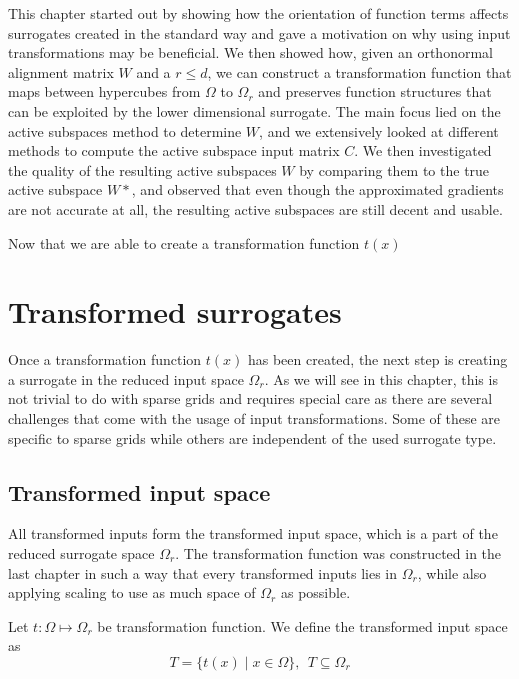 \documentclass[
  a4paper,  %
  twoside,  %
  bibliography=totoc,
  headsepline,
  cleardoublepage=empty,
  parskip=half,
  draft=false
]{scrbook}
\begin{document}
This chapter started out by showing how the orientation of function terms affects surrogates created in the standard way and gave a motivation on why using input transformations may be beneficial.
We then showed how, given an orthonormal alignment matrix $W$ and a $r \leq d$, we can construct a transformation function that maps between hypercubes from $\Omega$ to $\Omega_r$ and preserves function structures that can be exploited by the lower dimensional surrogate.
The main focus lied on the active subspaces method to determine $W$, and we extensively looked at different methods to compute the active subspace input matrix $C$.
We then investigated the quality of the resulting active subspaces $W$ by comparing them to the true active subspace $W*$, and observed that even though the approximated gradients are not accurate at all, the resulting active subspaces are still decent and usable.

Now that we are able to create a transformation function $t(x)$

\chapter{Transformed surrogates}
\label{chap:c4}

Once a transformation function $t(x)$ has been created, the next step is creating a surrogate in the reduced input space $\Omega_r$.
As we will see in this chapter, this is not trivial to do with sparse grids and requires special care as there are several challenges that come with the usage of input transformations.
Some of these are specific to sparse grids while others are independent of the used surrogate type.


\section{Transformed input space}

All transformed inputs form the transformed input space, which is a part of the reduced surrogate space $\Omega_r$.
The transformation function was constructed in the last chapter in such a way that every transformed inputs lies in $\Omega_r$, while also applying scaling to use as much space of $\Omega_r$ as possible.

\begin{definition}
Let $t \colon \Omega \mapsto \Omega_r$ be transformation function.
We define the transformed input space as
\begin{equation}
T=\{t(x) \mid x \in\Omega\}, ~~ T \subseteq \Omega_r
\end{equation}
\end{definition}
\end{document}
